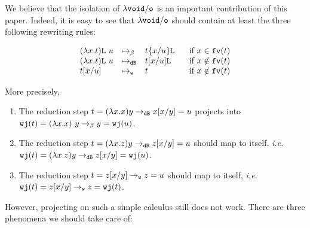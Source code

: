 \documentclass{LMCS}
\newcommand{\ie}{{\it  i.e.}~}
\renewcommand{\>}{\rightarrow}
\def\lam{\lambda}
\newcommand{\Rew}[1]{\rightarrow_{#1}}
\newcommand{\rRew}[1]{\mapsto_{#1}}
\newcommand{\isubs}[1]{ \{ #1  \} }
\newcommand{\B}{{\tt dB}}
\newcommand{\dis}{{\tt j}}
\newcommand{\fv}[1]{{\tt fv}(#1)}
\newcommand{\Gc}{{\tt w}}
\newcommand{\wfc}{\Gc\dis}
\newcommand{\slist}{{\tt L}}
\newcommand{\modulo}[2]{#1/#2}
\newcommand{\osymb}{{\tt o}}
\newcommand{\aux}{{\tt void}}
\newcommand{\lauxm}{\lam\modulo{ \aux }{ \osymb }}
\begin{document}
We believe that the isolation of $\lauxm$ is an important contribution
of this paper. Indeed, it is easy to
see that $\lauxm$ should contain at least the three following rewriting rules:

\[ \begin{array}{lll@{\hspace{.5cm}}lll}
(\lam x.t) \slist\ u & \rRew{\beta} &  t\isubs{x/u}\slist & \mbox{  if }  x \in \fv{t}\\
(\lam x.t) \slist\ u & \rRew{\B} &  t[x/u]\slist & \mbox{  if }  x \notin \fv{t}\\
t[x/u] & \rRew{\Gc} & t & \mbox{  if }  x \notin \fv{t} \\
\end{array}\] 

More precisely, 

\begin{enumerate}[$\bullet$]
  \item The reduction step $t=(\lam x. x) y\Rew{\B} x[x/y]=u$ projects into $\wfc(t) = (\lam x. x)\ y \Rew{\beta} y= \wfc(u)$. 
\item The reduction step $t=(\lam 
 x. z) y\Rew{\B} z[x/y]=u$ should map to itself, \ie\ $\wfc(t) = (\lam x. z) y \Rew{\B} z[x/y]= \wfc(u)$. 
\item The reduction step $t=z[x/y]\Rew{\Gc}z=u$ 
 should map to itself, \ie\
$\wfc(t)= z[x/y]\Rew{\Gc} z = \wfc(t)$.
\end{enumerate}
However,  projecting on
such a simple calculus still does not work. There are 
three  phenomena  we should
take care of:
\end{document}
